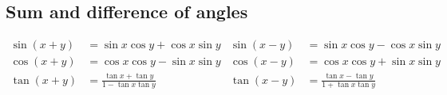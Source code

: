 \subsection*{Sum and difference of angles}

\begin{align*}
  \sin(x + y) &= \sin x \cos y + \cos x \sin y
  &\sin(x - y) &= \sin x \cos y - \cos x \sin y\\
  \cos(x + y) &= \cos x \cos y - \sin x \sin y
  &\cos(x - y) &= \cos x \cos y + \sin x \sin y\\
  \tan(x + y) &= \frac{\tan x + \tan y}{1 - \tan x \tan y}
  &\tan(x - y) &= \frac{\tan x - \tan y}{1 + \tan x \tan y}
\end{align*}